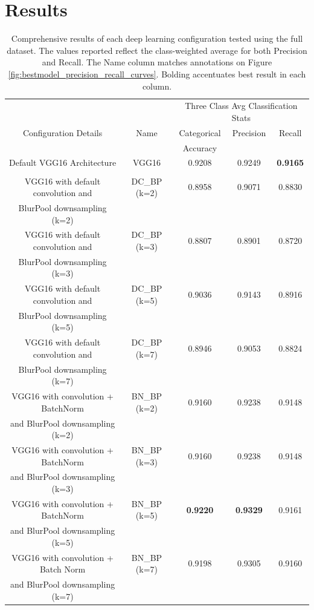 \section{Results}
\label{sec:bestmodel_results}

\begin{table}[t]
	\centering
	\begin{tabular}{ccccc}
		& & \multicolumn{3}{c}{ Three Class Avg Classification Stats } \\
		Configuration Details & Name & Categorical & Precision & Recall \\
		&      & Accuracy    &           &        \\
		Default VGG16 Architecture & VGG16 & 0.9208 & 0.9249 & \textbf{0.9165} \\
		& & & & \\
		VGG16 with default convolution and & DC\_BP (k=2) & 0.8958 & 0.9071 & 0.8830 \\
		BlurPool downsampling (k=2) & & & & \\
		VGG16 with default convolution and & DC\_BP (k=3) & 0.8807 & 0.8901 & 0.8720 \\
		BlurPool downsampling (k=3) & & & & \\
		VGG16 with default convolution and & DC\_BP (k=5) & 0.9036 & 0.9143 & 0.8916 \\
		BlurPool downsampling (k=5) & & & & \\
		VGG16 with default convolution and & DC\_BP (k=7) & 0.8946 & 0.9053 & 0.8824 \\
		BlurPool downsampling (k=7) & & & & \\
		VGG16 with convolution + BatchNorm & BN\_BP (k=2) & 0.9160 & 0.9238 & 0.9148 \\
		and BlurPool downsampling (k=2) & & & & \\
		VGG16 with convolution + BatchNorm & BN\_BP (k=3) & 0.9160 & 0.9238 & 0.9148 \\
		and BlurPool downsampling (k=3) & & & & \\
		VGG16 with convolution + BatchNorm & BN\_BP (k=5) & \textbf{0.9220} & \textbf{0.9329} & 0.9161 \\
		and BlurPool downsampling (k=5) & & & & \\
		VGG16 with convolution + Batch Norm & BN\_BP (k=7) & 0.9198 & 0.9305 & 0.9160 \\
		and BlurPool downsampling (k=7) & & & & \\
	\end{tabular}
	\caption{Comprehensive results of each deep learning configuration tested using the full dataset. The values reported reflect the class-weighted average for both Precision and Recall. The Name column matches annotations on Figure \ref{fig:bestmodel_precision_recall_curves}. Bolding accentuates best result in each column.}
	\label{table:experiment_results}
\end{table}

